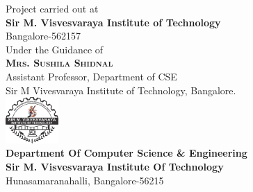 \begin{titlepage}
	\Large{Project carried out at\\
		\textbf{Sir M. Visvesvaraya Institute of Technology}
		\\Bangalore-562157
	}\\[10pt]
	\Large{Under the Guidance of\\
		\textbf{\textsc{\Large Mrs. Sushila Shidnal }}\\
		Assistant Professor, Department of CSE\\
		Sir M Vivesvaraya Institute of Technology, Bangalore.
	}\\[10pt]
	\includegraphics[width=0.15\textwidth]{images/mvit.png}\\[10pt] 
	\Large{
		\textbf{Department Of Computer Science \& Engineering}\\
		\textbf{Sir M. Visvesvaraya Institute Of Technology}\\
		Hunasamaranahalli, Bangalore-56215\\
	}

\end{titlepage}


